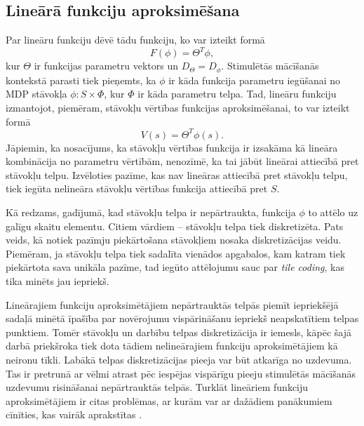 \documentclass{ludis} %
\begin{document}
\subsection{Lineārā funkciju aproksimēšana}
Par lineāru funkciju dēvē tādu funkciju, ko var izteikt formā
\[
	F(\phi) = \Theta^T \phi,
\]
kur $\Theta$ ir funkcijas parametru vektors un $D_\Theta = D_\phi$.
Stimulētās mācīšanās kontekstā parasti tiek pieņemts, ka $\phi$ ir kāda funkcija
parametru iegūšanai no MDP stāvokļa $\phi : S \times \Phi$, kur $\Phi$ ir kāda
parametru telpa. Tad, lineāru funkciju izmantojot, piemēram, stāvokļu vērtības
funkcijas aproksimēšanai, to var izteikt formā
\[
	V(s) = \Theta^T \phi(s).
\]
Jāpiemin, ka nosacījums, ka stāvokļu vērtības funkcija ir izsakāma kā lineāra
kombinācija no parametru vērtībām, nenozīmē, ka tai jābūt lineārai attiecībā
pret stāvokļu telpu. Izvēloties pazīme, kas nav lineāras attiecībā pret stāvokļu
telpu, tiek iegūta nelineāra stāvokļu vērtības funkcija attiecībā pret $S$.

Kā redzams, gadījumā, kad stāvokļu telpa ir nepārtraukta, funkcija $\phi$ to
attēlo uz galīgu skaitu elementu. Citiem vārdiem -- stāvokļu telpa tiek
diskretizēta. Pats veids, kā notiek pazīmju piekārtošana stāvokļiem nosaka
diskretizācijas veidu. Piemēram, ja stāvokļu telpa tiek sadalīta vienādos
apgabalos, kam katram tiek piekārtota sava unikāla pazīme, tad iegūto attēlojumu
sauc par \textit{tile coding}, kas tika minēts jau iepriekš.

Lineārajiem funkciju aproksimētājiem nepārtrauktās telpās piemīt iepriekšējā
sadaļā minētā īpašība par novērojumu vispārināšanu iepriekš neapskatītiem telpas
punktiem. Tomēr stāvokļu un darbību telpas diskretizācija ir iemesls, kāpēc šajā
darbā priekšroka tiek dota tādiem nelineārajiem funkciju aproksimētājiem kā
neironu tīkli. Labākā telpas diskretizācijas pieeja var būt atkarīga no
uzdevuma. Tas ir pretrunā ar vēlmi atrast pēc iespējas vispārīgu pieeju
stimulētās mācīšanās uzdevumu risināšanai nepārtrauktās telpās. Turklāt
lineāriem funkciju aproksimētājiem ir citas problēmas, ar kurām var ar dažādiem
panākumiem cīnīties, kas vairāk aprakstītas \autocite{Hasselt2012}.
\end{document}
